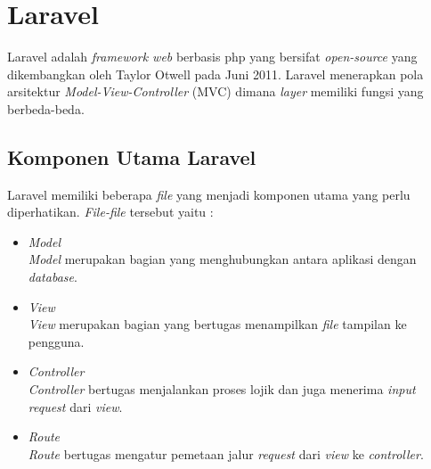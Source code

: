 \section{Laravel}
\label{sec:laravel}
Laravel adalah \textit{framework web} berbasis php yang bersifat \textit{open-source} yang dikembangkan oleh Taylor Otwell pada Juni 2011\cite{surguy:2013}. Laravel menerapkan pola arsitektur \textit{Model-View-Controller} (MVC) dimana \textit{layer} memiliki fungsi yang berbeda-beda.

\subsection{Komponen Utama Laravel}
\label{sec:komponen_utama_laravel}
Laravel memiliki beberapa \textit{file} yang menjadi komponen utama yang perlu diperhatikan. \textit{File-file} tersebut yaitu\cite{laravel:2016} :
\begin{itemize}
	\item \textit{Model}\\
	\textit{Model} merupakan bagian yang menghubungkan antara aplikasi dengan \textit{database}.
	\item \textit{View}\\
	\textit{View} merupakan bagian yang bertugas menampilkan \textit{file} tampilan ke pengguna.  
	\item \textit{Controller}\\
	\textit{Controller} bertugas menjalankan proses lojik dan juga menerima \textit{input request} dari \textit{view}.
	\item \textit{Route}\\
	\textit{Route} bertugas mengatur pemetaan jalur \textit{request} dari \textit{view} ke \textit{controller}.  
\end{itemize}